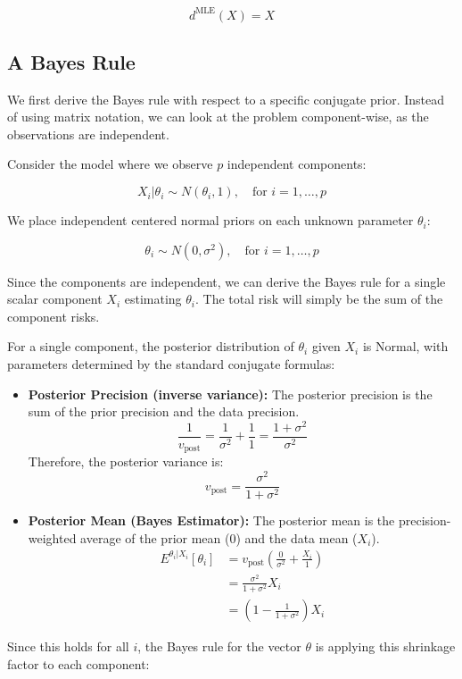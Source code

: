 \documentclass[
  letterpaper,
  DIV=11,
  numbers=noendperiod]{scrreprt}
\renewcommand{\[}{\begin{equation}}
\renewcommand{\]}{\end{equation}}
\theoremstyle{definition}
\theoremstyle{plain}
\theoremstyle{plain}
\theoremstyle{plain}
\theoremstyle{definition}
\theoremstyle{plain}
\theoremstyle{remark}
\begin{document}
\[
d^{\text{MLE}}(X) = X
\]

\subsection{A Bayes Rule}\label{a-bayes-rule}

We first derive the Bayes rule with respect to a specific conjugate
prior. Instead of using matrix notation, we can look at the problem
component-wise, as the observations are independent.

Consider the model where we observe \(p\) independent components:

\[
X_i | \theta_i \sim N(\theta_i, 1), \quad \text{for } i = 1, \ldots, p
\]

We place independent centered normal priors on each unknown parameter
\(\theta_i\):

\[
\theta_i \sim N(0, \sigma^2), \quad \text{for } i = 1, \ldots, p
\]

Since the components are independent, we can derive the Bayes rule for a
single scalar component \(X_i\) estimating \(\theta_i\). The total risk
will simply be the sum of the component risks.

For a single component, the posterior distribution of \(\theta_i\) given
\(X_i\) is Normal, with parameters determined by the standard conjugate
formulas:

\begin{itemize}
\item
  \textbf{Posterior Precision (inverse variance):} The posterior
  precision is the sum of the prior precision and the data precision. \[
  \frac{1}{v_{\text{post}}} = \frac{1}{\sigma^2} + \frac{1}{1} = \frac{1 + \sigma^2}{\sigma^2}
  \] Therefore, the posterior variance is: \[
  v_{\text{post}} = \frac{\sigma^2}{1 + \sigma^2}
  \]
\item
  \textbf{Posterior Mean (Bayes Estimator):} The posterior mean is the
  precision-weighted average of the prior mean (0) and the data mean
  (\(X_i\)). \[
  \begin{aligned}
  E^{\theta_i|X_i}[\theta_i] &= v_{\text{post}} \left( \frac{0}{\sigma^2} + \frac{X_i}{1} \right) \\
  &= \frac{\sigma^2}{1 + \sigma^2} X_i \\
  &= \left( 1 - \frac{1}{1 + \sigma^2} \right) X_i
  \end{aligned}
  \]
\end{itemize}

Since this holds for all \(i\), the Bayes rule for the vector \(\theta\)
is applying this shrinkage factor to each component:
\end{document}
